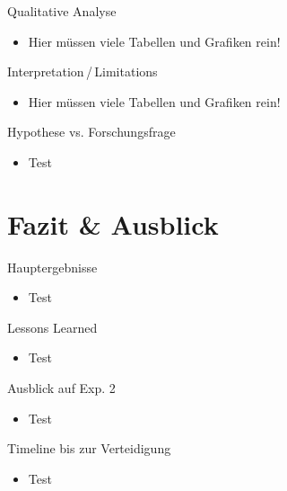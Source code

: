 \documentclass[usenames, dvipsnames, aspectratio=32]{beamer}
\begin{document}
\begin{frame}{Qualitative Analyse}
    \begin{itemize}
        \item Hier müssen viele Tabellen und Grafiken rein!
    \end{itemize}
\end{frame}

\begin{frame}{Interpretation\,/\,Limitations}
    \begin{itemize}
        \item Hier müssen viele Tabellen und Grafiken rein!
    \end{itemize}
\end{frame}

\begin{frame}{Hypothese vs. Forschungsfrage}
    \begin{itemize}
        \item Test
    \end{itemize}
\end{frame}

\section{Fazit \& Ausblick}

\begin{frame}{Hauptergebnisse}
    \begin{itemize}
        \item Test
    \end{itemize}
\end{frame}

\begin{frame}{Lessons Learned}
    \begin{itemize}
        \item Test
    \end{itemize}
\end{frame}

\begin{frame}{Ausblick auf Exp. 2}
    \begin{itemize}
        \item Test
    \end{itemize}
\end{frame}

\begin{frame}{Timeline bis zur Verteidigung}
    \begin{itemize}
        \item Test
    \end{itemize}
\end{frame}
\end{document}
